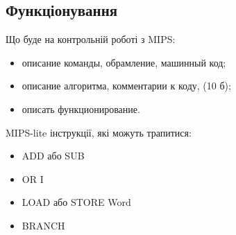 \subsection{Функціонування}
Що буде на контрольній роботі з MIPS:
\begin{itemize}
\item описание команды, обрамление, машинный код;
\item описание алгоритма, комментарии к коду,  (10 б);
\item описать функционирование.
\end{itemize}

MIPS-lite інструкції, які можуть трапитися:
\begin{itemize}
\item ADD або SUB
\item OR I
\item LOAD або  STORE Word
\item BRANCH
\end{itemize}
